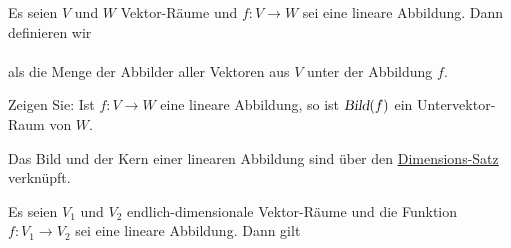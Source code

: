 \begin{Definition}[Bild]
Es seien $V$ und $W$ Vektor-R\"{a}ume und $f:V \rightarrow W$ sei eine lineare Abbildung.  Dann 
definieren wir
\\[0.2cm]
\hspace*{1.3cm}
\colorbox{red}{}
\\[0.2cm]
als die Menge der Abbilder aller Vektoren aus $V$ unter der Abbildung $f$.
\eoxs
\end{Definition}

\exercise
Zeigen Sie: Ist $f: V \rightarrow W$ eine lineare Abbildung, so ist $\textsl{Bild}(f)$ ein Untervektor-Raum von $W$.
\eox

Das Bild und der Kern einer linearen Abbildung sind \"uber den
\href{https://de.wikipedia.org/wiki/Rangsatz}{Dimensions-Satz} verkn\"upft.

\begin{Satz}
  Es seien $V_1$ und $V_2$ endlich-dimensionale Vektor-R\"{a}ume und die Funktion $f: V_1 \rightarrow V_2$ sei eine lineare Abbildung.
  Dann gilt
  \\[0.2cm]
  \hspace*{1.3cm}
  \colorbox{red}{}
\end{Satz}

